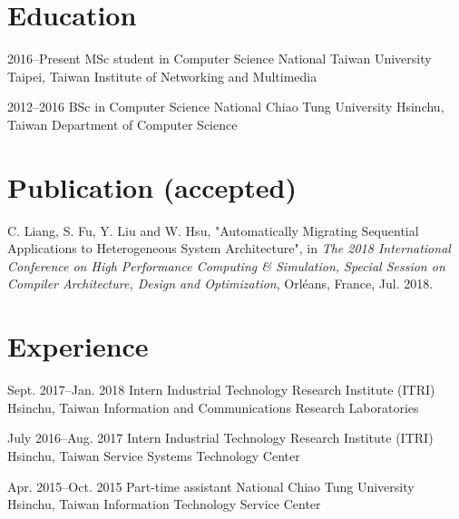 \documentclass[11pt,a4paper,sans,english]{moderncv}
\begin{document}
\makecvtitle

\section{Education}
    \cventry
        {2016--Present} %
        {MSc student in Computer Science} %
        {National Taiwan University} %
        {Taipei, Taiwan} %
        {Institute of Networking and Multimedia} %
        {}

    \cventry
        {2012--2016}
        {BSc in Computer Science}
        {National Chiao Tung University}
        {Hsinchu, Taiwan}
        {Department of Computer Science}
        {%
        }
        
\section{Publication (accepted)}
    C. Liang, S. Fu, Y. Liu and W. Hsu, "Automatically Migrating Sequential Applications to Heterogeneous System Architecture", in \textit{The 2018 International Conference on High Performance Computing \& Simulation, Special Session on Compiler Architecture, Design and Optimization}, Orléans, France, Jul. 2018.

\section{Experience}
    \cventry
        {Sept. 2017--Jan. 2018} %
        {Intern} %
        {Industrial Technology Research Institute (ITRI)} %
        {Hsinchu, Taiwan} %
        {Information and Communications Research Laboratories} %
        {} %

    \cventry
        {July 2016--Aug. 2017}
        {Intern}
        {Industrial Technology Research Institute (ITRI)}
        {Hsinchu, Taiwan}
        {Service Systems Technology Center}
        {}
        
    \cventry
        {Apr. 2015--Oct. 2015}
        {Part-time assistant}
        {National Chiao Tung University}
        {Hsinchu, Taiwan}
        {Information Technology Service Center}
        {}
        
\end{document}
